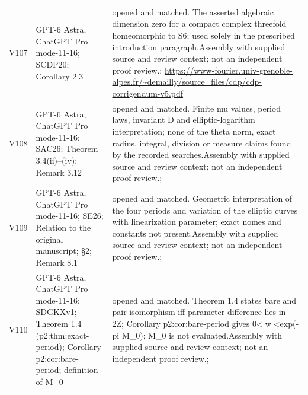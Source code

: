 \begin{longtable}{@{}L{.08\linewidth}L{.31\linewidth}L{.56\linewidth}@{}}
V107 & GPT-6 Astra, ChatGPT Pro mode-11-16; S\newline CDP20; Corollary 2.3 & opened and matched. The asserted algebraic dimension zero for a compact complex threefold homeomorphic to S6; used solely in the prescribed introduction paragraph.\newline Assembly with supplied source and review context; not an independent proof review.\newline {}; \url{https://www-fourier.univ-grenoble-alpes.fr/~demailly/source_files/cdp/cdp-corrigendum-v5.pdf}\\
V108 & GPT-6 Astra, ChatGPT Pro mode-11-16; S\newline AC26; Theorem 3.4(ii)--(iv); Remark 3.12 & opened and matched. Finite mu values, period laws, invariant D and elliptic-logarithm interpretation; none of the theta norm, exact radius, integral, division or measure claims found by the recorded searches.\newline Assembly with supplied source and review context; not an independent proof review.\newline {}; \\
V109 & GPT-6 Astra, ChatGPT Pro mode-11-16; S\newline E26; Relation to the original manuscript; §2; Remark 8.1 & opened and matched. Geometric interpretation of the four periods and variation of the elliptic curves with linearization parameter; exact nomes and constants not present.\newline Assembly with supplied source and review context; not an independent proof review.\newline {}; \\
V110 & GPT-6 Astra, ChatGPT Pro mode-11-16; S\newline DGKXv1; Theorem 1.4 (p2:\allowbreak{}thm:\allowbreak{}exact-period); Corollary p2:\allowbreak{}cor:\allowbreak{}bare-period; definition of M\_\allowbreak{}0 & opened and matched. Theorem 1.4 states bare and pair isomorphism iff parameter difference lies in 2Z; Corollary p2:\allowbreak{}cor:\allowbreak{}bare-period gives 0<|w|<exp(-pi M\_\allowbreak{}0); M\_\allowbreak{}0 is not evaluated.\newline Assembly with supplied source and review context; not an independent proof review.\newline {}; \\

\end{longtable}
